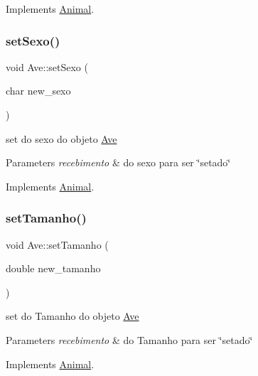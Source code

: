 Implements \mbox{\hyperlink{class_animal}{Animal}}.

\mbox{\label{class_ave_a75f8147318f338b36058d59a48c42ec8}} 
\subsubsection{\texorpdfstring{setSexo()}{setSexo()}}
{\footnotesize\ttfamily void Ave\+::set\+Sexo (\begin{DoxyParamCaption}\item[{char}]{new\+\_\+sexo }\end{DoxyParamCaption})\hspace{0.3cm}{\ttfamily [virtual]}}



set do sexo do objeto \mbox{\hyperlink{class_ave}{Ave}} 


\begin{DoxyParams}{Parameters}
{\em recebimento} & do sexo para ser \char`\"{}setado\char`\"{} \\
\hline
\end{DoxyParams}


Implements \mbox{\hyperlink{class_animal}{Animal}}.

\mbox{\label{class_ave_a86e3ee7da6fec2e19736b9ac253555c7}} 
\subsubsection{\texorpdfstring{setTamanho()}{setTamanho()}}
{\footnotesize\ttfamily void Ave\+::set\+Tamanho (\begin{DoxyParamCaption}\item[{double}]{new\+\_\+tamanho }\end{DoxyParamCaption})\hspace{0.3cm}{\ttfamily [virtual]}}



set do Tamanho do objeto \mbox{\hyperlink{class_ave}{Ave}} 


\begin{DoxyParams}{Parameters}
{\em recebimento} & do Tamanho para ser \char`\"{}setado\char`\"{} \\
\hline
\end{DoxyParams}


Implements \mbox{\hyperlink{class_animal}{Animal}}.

